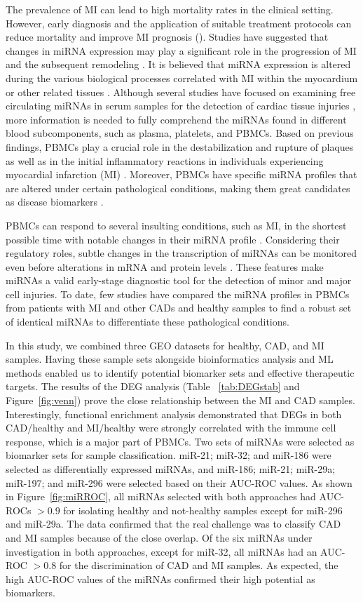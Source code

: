 \documentclass[sn-mathphys,Numbered]{sn-jnl}%
\theoremstyle{thmstyleone}%
\theoremstyle{thmstyletwo}%
\theoremstyle{thmstylethree}%
\begin{document}
The prevalence of MI can lead to high mortality rates in the clinical
setting. However, early diagnosis and the application of suitable
treatment protocols can reduce mortality and improve MI prognosis
(\cite{CVD, 17, 18}). Studies have suggested that changes in miRNA expression
may play a significant role in the progression of MI and the subsequent
remodeling \cite{23}. It is believed that miRNA
expression is altered during the various biological processes correlated
with MI within the myocardium or other related tissues \cite{24}. Although several studies have focused on examining free
circulating miRNAs in serum samples for the detection of cardiac tissue
injuries \cite{11-15}, more information is needed to fully
comprehend the miRNAs found in different blood subcomponents, such as
plasma, platelets, and PBMCs. Based on previous findings, PBMCs play a
crucial role in the destabilization and rupture of plaques as well as in
the initial inflammatory reactions in individuals experiencing
myocardial infarction (MI) \cite{Meder6, Meder23}.
Moreover, PBMCs have specific miRNA profiles that are altered under
certain pathological conditions, making them great candidates as disease
biomarkers \cite{Meder6}.

PBMCs can respond to several insulting conditions, such as MI, in the
shortest possible time with notable changes in their miRNA profile
\cite{Meder6}. Considering their regulatory roles, subtle
changes in the transcription of miRNAs can be monitored even before
alterations in mRNA and protein levels \cite{miR}. These
features make miRNAs a valid early-stage diagnostic tool for the
detection of minor and major cell injuries. To date, few studies have
compared the miRNA profiles in PBMCs from patients with MI and other
CADs and healthy samples to find a robust set of identical miRNAs to
differentiate these pathological conditions.

In this study, we combined three GEO datasets for healthy, CAD, and MI
samples. Having these sample sets alongside bioinformatics analysis and
ML methods enabled us to identify potential biomarker sets and effective
therapeutic targets. The results of the DEG analysis (Table
~\ref{tab:DEGstab} and Figure~\ref{fig:venn}) prove the close
relationship between the MI and CAD samples. Interestingly, functional
enrichment analysis demonstrated that DEGs in both CAD/healthy and
MI/healthy were strongly correlated with the immune cell response, which
is a major part of PBMCs. Two sets of miRNAs were selected as biomarker
sets for sample classification. miR-21; miR-32; and miR-186 were
selected as differentially expressed miRNAs, and miR-186; miR-21;
miR-29a; miR-197; and miR-296 were selected based on their AUC-ROC
values. As shown in Figure~\ref{fig:miRROC}, all miRNAs selected with
both approaches had AUC-ROCs $> 0.9$ for isolating healthy and
not-healthy samples except for miR-296 and miR-29a. The data confirmed
that the real challenge was to classify CAD and MI samples because of
the close overlap. Of the six miRNAs under investigation in both
approaches, except for miR-32, all miRNAs had an AUC-ROC $> 0.8$ for
the discrimination of CAD and MI samples. As expected, the high AUC-ROC
values of the miRNAs confirmed their high potential as biomarkers.
\end{document}
